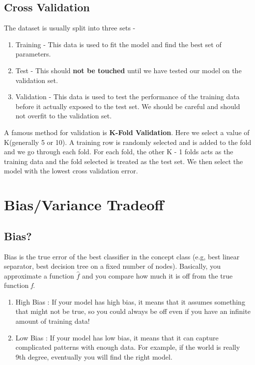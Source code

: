 \documentclass{article}
\begin{document}
\subsection {Cross Validation}
The dataset is usually split into three sets - 
\begin{enumerate}
\item Training - This data is used to fit the model and find the best set of parameters. 
\item Test - This should \textbf{not be touched} until we have tested our model on the validation set. 
\item Validation - This data is used to test the performance of the training data before it actually exposed to the test set. We should be careful and should not overfit to the validation set. 
\end{enumerate}
A famous method for validation is \textbf{K-Fold Validation}. Here we select a value of K(generally 5 or 10). A training row is randomly selected and is added to the fold and we go through each fold. 
For each fold, the other K - 1 folds acts as the training data and  the fold selected is treated as the test set. We then select the model with the lowest cross validation error. 

\section{Bias/Variance Tradeoff}

\subsection {Bias?}
Bias is the true error of the best classifier in the concept class (e.g, best linear separator, best decision tree on a fixed number of nodes). Basically, you approximate a function $\hat{f}$ and you compare how much it is off from the true 
function \emph{f}.
\begin{enumerate}
\item High Bias :  If your model has high bias, it means that it assumes something that might not be true, so you could always be off even if you have an infinite amount of training data! 
\item Low Bias : If your model has low bias, it means that it can capture complicated patterns with enough data. For example, if the world is really 9th degree, eventually you will find the right model. 
\end{enumerate}
\end{document}
